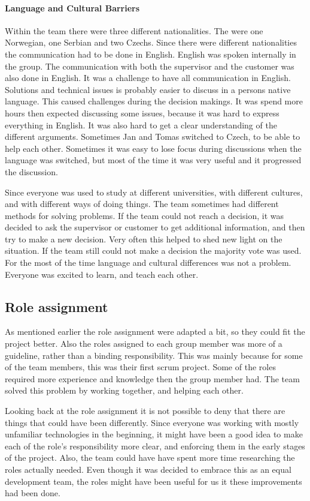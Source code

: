 \paragraph{Language and Cultural Barriers}

Within the team there were three different nationalities. The were one Norwegian, one Serbian and two Czechs. Since there were different nationalities the communication had to be done in English. English was spoken internally in the group. The communication with both the supervisor and the customer
was also done in English. It was a challenge to have all communication in English. Solutions and technical issues is probably easier to discuss in a persons native language. This caused challenges during the decision makings. It was spend more hours then expected discussing some issues, because it was hard to express everything in English. It was also hard to get a clear understanding of the different arguments. Sometimes Jan and Tomas switched to Czech, to be able to help each other. Sometimes it was easy to lose focus during discussions when the language was switched, but most of the time it was very useful and it progressed the discussion.

Since everyone was used to study at different universities, with different cultures, and with different ways of doing things. The team sometimes had different methods for solving problems. If the team could not reach a decision, it was decided to ask the supervisor or customer to get additional information, and then try to make a new decision. Very often this helped to shed new light on the situation. If the team still could not make a decision the majority vote was used. For the most of the time language and cultural differences was not a problem. Everyone was excited to learn, and teach each other. 

\subsection{Role assignment}
As mentioned earlier the role assignment were adapted a bit, so they could fit the project better. Also the roles assigned to each group member was more of a guideline, rather than a binding responsibility. This was mainly because for some of the team members, this was their first scrum project. Some of the roles required more experience and knowledge then the group member had. The team solved this problem by working together, and helping each other. 

Looking back at the role assignment it is not possible to deny that there are things that could have been differently. Since everyone was working with mostly unfamiliar technologies in the beginning, it might have been a good idea to make each of the role's responsibility more clear, and enforcing them in the early stages of the project. Also, the team could have have spent more time researching the roles actually needed. Even though it was decided to embrace this as an equal development team, the roles might have been useful for us it these improvements had been done. 

